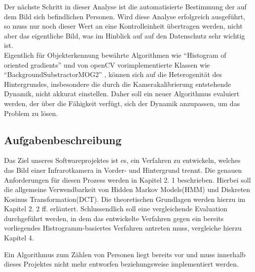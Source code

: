 Der nächste Schritt in dieser Analyse ist die automatisierte Bestimmung der auf dem Bild sich befindlichen Personen.
 Wird diese Analyse erfolgreich ausgeführt, so muss nur noch dieser Wert an eine Kontrolleinheit übertragen werden, nicht aber das eigentliche Bild, was im Hinblick auf auf den Datenschutz sehr wichtig ist.\\


Eigentlich für Objekterkennung bewährte Algorithmen wie “Histogram of oriented gradients” und von openCV vorimplementierte Klassen wie  “BackgroundSubstractorMOG2” , können sich auf die Heterogenität des Hintergrundes, insbesondere die durch die Kamerakalibrierung entstehende Dynamik, nicht akkurat einstellen.
 Daher soll ein neuer Algorithmus evaluiert werden, der über die Fähigkeit verfügt, sich der Dynamik anzupassen, um das Problem zu lösen.\\


\subsection{Aufgabenbeschreibung}
\label{sec:aufgabenbeschr}

Das Ziel unseres Softwareprojektes ist es, ein Verfahren zu entwickeln, welches das Bild einer Infrarotkamera in Vorder- und Hintergrund trennt.
 Die genauen Anforderungen für diesen Prozess werden in Kapitel 2.
1 beschrieben.
 Hierbei soll die allgemeine Verwendbarkeit von Hidden Markov Models(HMM) und Diskreten Kosinus Transformation(DCT).
 Die theoretischen Grundlagen werden hierzu im Kapitel 2.
2 ff. erläutert.
 Schlussendlich soll eine vergleichende Evaluation durchgeführt werden, in dem das entwickelte Verfahren gegen ein bereits vorliegendes Histrogramm-basiertes Verfahren antreten muss, vergleiche hierzu Kapitel 4.

Ein Algorithmus zum Zählen von Personen liegt bereits vor und muss innerhalb dieses Projektes nicht mehr entworfen beziehungsweise implementiert werden.

